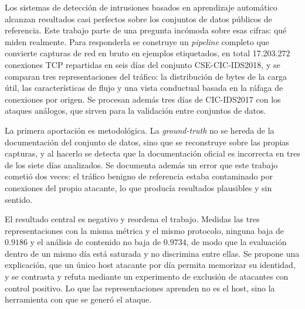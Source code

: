 %
%

Los sistemas de detección de intrusiones basados en aprendizaje automático
alcanzan resultados casi perfectos sobre los conjuntos de datos públicos de
referencia. Este trabajo parte de una pregunta incómoda sobre esas cifras: qué
miden realmente. Para responderla se construye un \emph{pipeline} completo que
convierte capturas de red en bruto en ejemplos etiquetados, en total 17.203.272
conexiones TCP repartidas en seis días del conjunto CSE-CIC-IDS2018, y se
comparan tres representaciones del tráfico: la distribución de bytes de la carga
útil, las características de flujo y una vista conductual basada en la ráfaga de
conexiones por origen. Se procesan además tres días de CIC-IDS2017 con los
ataques análogos, que sirven para la validación entre conjuntos de datos.

La primera aportación es metodológica. La \emph{ground-truth} no se hereda de la
documentación del conjunto de datos, sino que se reconstruye sobre las propias
capturas, y al hacerlo se detecta que la documentación oficial es incorrecta en
tres de los siete días analizados. Se documenta además un error que este trabajo
cometió dos veces: el tráfico benigno de referencia estaba contaminado por
conexiones del propio atacante, lo que producía resultados plausibles y sin
sentido.

El resultado central es negativo y reordena el trabajo. Medidas las tres
representaciones con la misma métrica y el mismo protocolo, ninguna baja de
$0.9186$ y el análisis de contenido no baja de $0.9734$, de modo que la
evaluación dentro de un mismo día está saturada y no discrimina entre ellas. Se
propone una explicación, que un único host atacante por día permita memorizar su
identidad, y se contrasta y refuta mediante un experimento de exclusión de
atacantes con control positivo. Lo que las representaciones aprenden no es el
host, sino la herramienta con que se generó el ataque.

